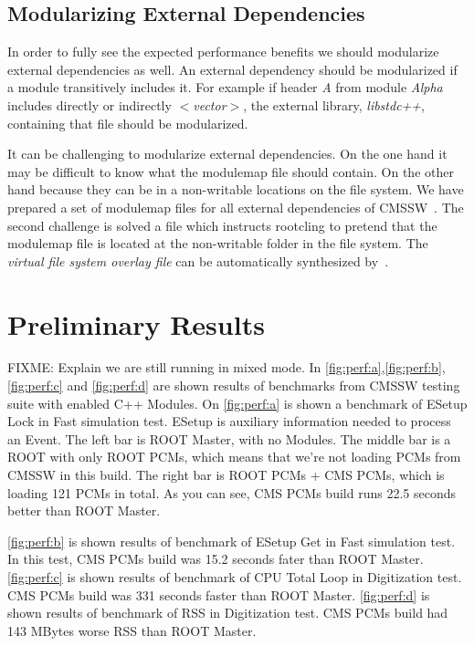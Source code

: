 \documentclass[12pt]{iopart}
\begin{document}
\subsection{Modularizing External Dependencies}

In order to fully see the expected performance benefits we should modularize external dependencies as well. An external dependency should be modularized if a module transitively includes it. For example if header \textit{A} from module \textit{Alpha} includes directly or indirectly \textit{$<$vector$>$}, the external library, \textit{libstdc++}, containing that file should be modularized.

It can be challenging to modularize external dependencies. On the one hand it may be difficult to know what the modulemap file should contain. On the other hand because they can be in a non-writable locations on the file system. We have prepared a set of modulemap files for all external dependencies of CMSSW~\cite{raphael-auto-Modules}. The second challenge is solved a file which instructs rootcling to pretend that the modulemap file is located at the non-writable folder in the file system. The \textit{virtual file system overlay file} can be automatically synthesized by~\cite{raphael-auto-Modules}.


\section{Preliminary Results}
\label{results}
FIXME: Explain we are still running in mixed mode.
In \ref{fig:perf:a},\ref{fig:perf:b},\ref{fig:perf:c} and \ref{fig:perf:d} are shown results of benchmarks from CMSSW testing suite with enabled C++ Modules. On \ref{fig:perf:a} is shown a benchmark of ESetup Lock in Fast simulation test. ESetup is auxiliary information needed to process an Event. The left bar is ROOT Master, with no Modules. The middle bar is a ROOT with only ROOT PCMs, which means that we're not loading PCMs from CMSSW in this build. The right bar is ROOT PCMs + CMS PCMs, which is loading 121 PCMs in total. As you can see, CMS PCMs build runs 22.5 seconds better than ROOT Master.

\ref{fig:perf:b} is shown results of benchmark of ESetup Get in Fast simulation test. In this test, CMS PCMs build was 15.2 seconds fater than ROOT Master.
\ref{fig:perf:c} is shown results of benchmark of CPU Total Loop in Digitization test. CMS PCMs build was 331 seconds faster than ROOT Master.
\ref{fig:perf:d} is shown results of benchmark of RSS in Digitization test. CMS PCMs build had 143 MBytes worse RSS than ROOT Master.
\end{document}
